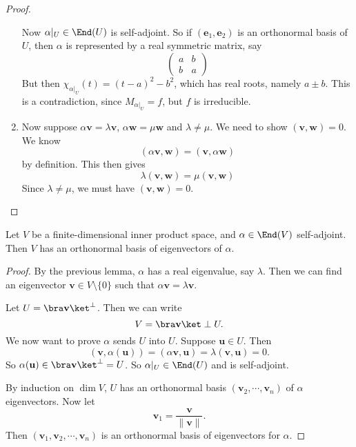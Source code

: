 \documentclass[a4paper]{article}
\begin{document}
\begin{proof}
\begin{enumerate}
      Now $\alpha|_U \in \End(U)$ is self-adjoint. So if $(\mathbf{e}_1, \mathbf{e}_2)$ is an orthonormal basis of $U$, then $\alpha$ is represented by a real symmetric matrix, say
      \[
        \begin{pmatrix}
          a & b\\
          b & a
        \end{pmatrix}
      \]
      But then $\chi_{\alpha|_U}(t) = (t - a)^2 - b^2$, which has real roots, namely $a \pm b$. This is a contradiction, since $M_{\alpha|_U} = f$, but $f$ is irreducible.
    \item Now suppose $\alpha \mathbf{v} = \lambda \mathbf{v}$, $\alpha \mathbf{w} = \mu \mathbf{w}$ and $\lambda \not= \mu$. We need to show $(\mathbf{v}, \mathbf{w}) = 0$. We know
      \[
        (\alpha \mathbf{v}, \mathbf{w}) = (\mathbf{v}, \alpha \mathbf{w})
      \]
      by definition. This then gives
      \[
        \lambda (\mathbf{v}, \mathbf{w}) = \mu (\mathbf{v}, \mathbf{w})
      \]
      Since $\lambda \not= \mu$, we must have $(\mathbf{v}, \mathbf{w}) = 0$.
  \end{enumerate}
\end{proof}

\begin{thm}
  Let $V$ be a finite-dimensional inner product space, and $\alpha \in \End(V)$ self-adjoint. Then $V$ has an orthonormal basis of eigenvectors of $\alpha$.
\end{thm}

\begin{proof}
  By the previous lemma, $\alpha$ has a real eigenvalue, say $\lambda$. Then we can find an eigenvector $\mathbf{v} \in V\setminus \{0\}$ such that $\alpha \mathbf{v} = \lambda \mathbf{v}$.

  Let $U = \bra \mathbf{v}\ket ^\perp$. Then we can write
  \[
    V = \bra \mathbf{v}\ket \perp U.
  \]
  We now want to prove $\alpha$ sends $U$ into $U$. Suppose $\mathbf{u} \in U$. Then
  \[
    (\mathbf{v}, \alpha (\mathbf{u})) = (\alpha \mathbf{v}, \mathbf{u}) = \lambda (\mathbf{v}, \mathbf{u}) = 0.
  \]
  So $\alpha (\mathbf{u}) \in \bra \mathbf{v}\ket^\perp = U$. So $\alpha|_U \in \End(U)$ and is self-adjoint.

  By induction on $\dim V$, $U$ has an orthonormal basis $(\mathbf{v}_2, \cdots, \mathbf{v}_n)$ of $\alpha$ eigenvectors. Now let
  \[
    \mathbf{v}_1 = \frac{\mathbf{v}}{\|\mathbf{v}\|}.
  \]
  Then $(\mathbf{v}_1, \mathbf{v}_2, \cdots, \mathbf{v}_n)$ is an orthonormal basis of eigenvectors for $\alpha$.
\end{proof}
\end{document}
